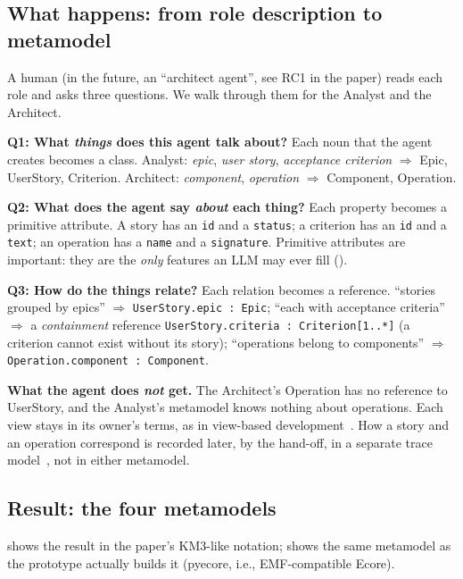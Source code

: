 \documentclass[10pt,a4paper]{article}
\newcommand{\cls}[1]{\textsf{#1}}
\newcommand{\code}[1]{\texttt{#1}}
\theoremstyle{definition}
\newcommand{\what}[1]{\par\smallskip\noindent\textbf{#1}\quad}
\begin{document}
\subsection{What happens: from role description to metamodel}

A human (in the future, an ``architect agent'', see RC1 in the paper) reads
each role and asks three questions. We walk through them for the Analyst and
the Architect.

\what{Q1: What \emph{things} does this agent talk about?} Each noun that the
agent creates becomes a class. Analyst: \emph{epic}, \emph{user story},
\emph{acceptance criterion} $\Rightarrow$ \cls{Epic}, \cls{UserStory},
\cls{Criterion}. Architect: \emph{component}, \emph{operation}
$\Rightarrow$ \cls{Component}, \cls{Operation}.

\what{Q2: What does the agent say \emph{about} each thing?} Each property
becomes a primitive attribute. A story has an \code{id} and a
\code{status}; a criterion has an \code{id} and a \code{text}; an operation
has a \code{name} and a \code{signature}. Primitive attributes are
important: they are the \emph{only} features an LLM may ever fill
().

\what{Q3: How do the things relate?} Each relation becomes a reference.
``stories grouped by epics'' $\Rightarrow$ \code{UserStory.epic : Epic};
``each with acceptance criteria'' $\Rightarrow$ a \emph{containment}
reference \code{UserStory.criteria : Criterion[1..*]} (a criterion cannot
exist without its story); ``operations belong to components'' $\Rightarrow$
\code{Operation.component : Component}.

\what{What the agent does \emph{not} get.} The Architect's \cls{Operation}
has no reference to \cls{UserStory}, and the Analyst's metamodel knows
nothing about operations. Each view stays in its owner's terms, as in
view-based development~\cite{klare2021vitruvius,bruneliere2019views}. How a story
and an operation correspond is recorded later, by the hand-off, in a
separate trace model~\cite{jouault2005traceability,vara2014metagem}, not in either metamodel.

\subsection{Result: the four metamodels}

 shows the result in the paper's KM3-like notation;
 shows the same metamodel as the prototype actually builds
it (pyecore, i.e., EMF-compatible Ecore).
\end{document}
